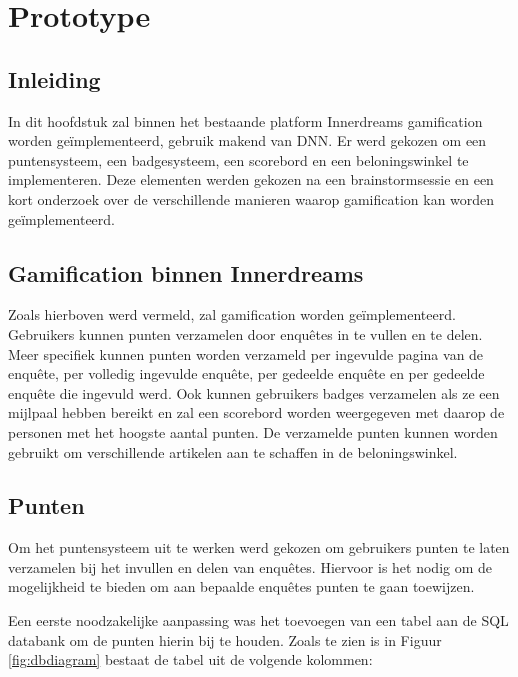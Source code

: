 
\chapter{Prototype}
\label{ch:prototype}

\section{Inleiding}

In dit hoofdstuk zal binnen het bestaande platform Innerdreams gamification worden geïmplementeerd, gebruik makend van DNN. Er werd gekozen om een puntensysteem, een badgesysteem, een scorebord en een beloningswinkel te implementeren. Deze elementen werden gekozen na een brainstormsessie en een kort onderzoek over de verschillende manieren waarop gamification kan worden geïmplementeerd.

\section{Gamification binnen Innerdreams}

Zoals hierboven werd vermeld, zal gamification worden geïmplementeerd. Gebruikers kunnen punten verzamelen door enquêtes in te vullen en te delen. Meer specifiek kunnen punten worden verzameld per ingevulde pagina van de enquête, per volledig ingevulde enquête, per gedeelde enquête en per gedeelde enquête die ingevuld werd. Ook kunnen gebruikers badges verzamelen als ze een mijlpaal hebben bereikt en zal een scorebord worden weergegeven met daarop de personen met het hoogste aantal punten. De verzamelde punten kunnen worden gebruikt om verschillende artikelen aan te schaffen in de beloningswinkel.

\section{Punten}

Om het puntensysteem uit te werken werd gekozen om gebruikers punten te laten verzamelen bij het invullen en delen van enquêtes. Hiervoor is het nodig om de mogelijkheid te bieden om aan bepaalde enquêtes punten te gaan toewijzen.
 
Een eerste noodzakelijke aanpassing was het toevoegen van een tabel aan de SQL databank om de punten hierin bij te houden. Zoals te zien is in Figuur \ref{fig:dbdiagram} bestaat de tabel uit de volgende kolommen:


